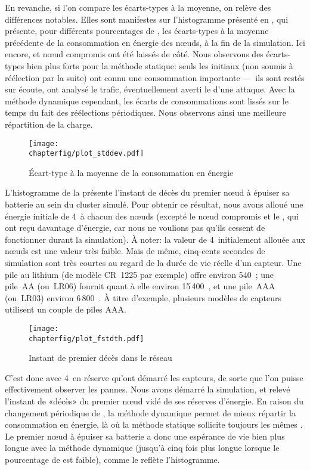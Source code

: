 En revanche, si l'on compare les écarts-types à la moyenne, on relève des différences notables.
Elles sont manifestes sur l'histogramme présenté en , qui présente, pour différents pourcentages de \cns, les écarts-types à la moyenne précédente de la consommation en énergie des nœuds, à la fin de la simulation.
Ici encore, \ch et nœud compromis ont été laissés de côté.
Nous observons des écarts-types bien plus forts pour la méthode statique: seuls les \cns initiaux (non soumis à réélection par la suite) ont connu une consommation importante ---~ils sont restés sur écoute, ont analysé le trafic, éventuellement averti le \ch d'une attaque.
Avec la méthode dynamique cependant, les écarts de consommations sont lissés sur le temps du fait des réélections périodiques.
Nous observons ainsi une meilleure répartition de la charge.
\begin{figure}[ht]
    \centering
    \texttt{[image: \\chapterfig/plot\_stddev.pdf]}
    \caption{Écart-type à la moyenne de la consommation en énergie}\label{sa:fig:conso-ecart-type}
\end{figure}

L'histogramme de la  présente l'instant de décès du premier nœud à épuiser sa batterie au sein du cluster simulé.
Pour obtenir ce résultat, nous avons alloué une énergie initiale de 4~\joule à chacun des nœuds (excepté le nœud compromis et le \ch, qui ont reçu davantage d'énergie, car nous ne voulions pas qu'ils cessent de fonctionner durant la simulation).
À noter: la valeur de 4~\joule initialement allouée aux nœuds est une valeur très faible.
Mais de même, cinq-cents secondes de simulation sont très courtes au regard de la durée de vie réelle d'un capteur.
Une pile au lithium (de modèle CR~1225 par exemple) offre environ 540~\joule; une pile~AA (ou~LR06) fournit quant à elle environ 15\,400~\joule, et une pile~AAA (ou~LR03) environ 6\,800~\joule.
À titre d'exemple, plusieurs modèles de capteurs utilisent un couple de piles AAA.
\begin{figure}[ht]
    \centering
    \texttt{[image: \\chapterfig/plot\_fstdth.pdf]}
    \caption{Instant de premier décès dans le réseau}\label{sa:fig:premier-deces}
\end{figure}
%

C'est donc avec 4~\joule en réserve qu'ont démarré les capteurs, de sorte que l'on puisse effectivement observer les pannes.
Nous avons démarré la simulation, et relevé l'instant de «décès» du premier nœud vidé de ses réserves d'énergie.
En raison du changement périodique de \cns, la méthode dynamique permet de mieux répartir la consommation en énergie, là où la méthode statique sollicite toujours les mêmes \cns.
Le premier nœud à épuiser sa batterie a donc une espérance de vie bien plus longue avec la méthode dynamique (jusqu'à cinq fois plus longue lorsque le pourcentage de \cns est faible), comme le reflète l'histogramme.


